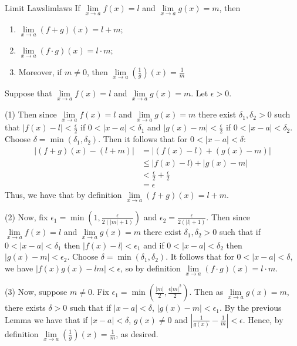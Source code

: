 \documentclass[12pt]{report}
\begin{document}
\begin{thm}{Limit Laws}{limlaws}
    If $\lim\limits_{x\rightarrow a}f(x) = l$ and $\lim\limits_{x\rightarrow a}g(x) = m$, then \begin{enumerate}
        \item $\lim\limits_{x\rightarrow a}(f+g)(x) = l+m$;
        \item $\lim\limits_{x\rightarrow a}(f\cdot g)(x) = l\cdot m$;
        \item Moreover, if $m \neq 0$, then $\lim\limits_{x\rightarrow a}\left(\frac{1}{g}\right)(x) = \frac{1}{m}$
    \end{enumerate}
\end{thm}
\begin{proof*}{}{}
    Suppose that $\lim\limits_{x\rightarrow a}f(x) = l$ and $\lim\limits_{x\rightarrow a}g(x) = m$. Let $\epsilon > 0$.


    (1) Then since $\lim\limits_{x\rightarrow a}f(x) = l$ and $\lim\limits_{x\rightarrow a}g(x) = m$ there exist $\delta_1,\delta_2 > 0$ such that $|f(x) - l| < \frac{\epsilon}{2}$ if $0 < |x-a| < \delta_1$ and $|g(x) - m| < \frac{\epsilon}{2}$ if $0 < |x-a| < \delta_2$. Choose $\delta = \min(\delta_1,\delta_2)$. Then it follows that for $0 < |x-a| < \delta$: \begin{align*}
        |(f+g)(x) - (l+m)| &= |(f(x) - l) + (g(x) - m)| \\
        &\leq |f(x) - l) + |g(x) - m| \\
        &< \frac{\epsilon}{2} + \frac{\epsilon}{2} \\
        &= \epsilon
    \end{align*}
    Thus, we have that by definition $\lim\limits_{x\rightarrow a}(f+g)(x) = l+m$.


    (2) Now, fix $\epsilon_1 = \min\left(1,\frac{\epsilon}{2(|m|+1)}\right)$ and $\epsilon_2 = \frac{\epsilon}{2(|l| + 1)}$. Then since $\lim\limits_{x\rightarrow a}f(x) = l$ and $\lim\limits_{x\rightarrow a}g(x) = m$ there exist $\delta_1, \delta_2> 0$ such that if $0<|x-a| < \delta_1$ then $|f(x) - l| < \epsilon_1$ and if $0<|x-a| < \delta_2$ then $|g(x) - m| < \epsilon_2$. Choose $\delta = \min(\delta_1,\delta_2)$. It follows that for $0<|x-a| < \delta$, we have $|f(x)g(x) - lm| < \epsilon$, so by definition $\lim\limits_{x\rightarrow a}(f\cdot g)(x) = l\cdot m$.



    (3) Now, suppose $m \neq 0$. Fix $\epsilon_1 = \min\left(\frac{|m|}{2},\frac{\epsilon|m|^2}{2}\right)$. Then as $\lim\limits_{x\rightarrow a}g(x) = m$, there exists $\delta > 0$ such that if $|x-a| < \delta$, $|g(x) - m| < \epsilon_1$. By the previous Lemma we have that if $|x-a| < \delta$, $g(x) \neq 0$ and $\left|\frac{1}{g(x)} - \frac{1}{m}\right| < \epsilon$. Hence, by definition $\lim\limits_{x\rightarrow a}\left(\frac{1}{g}\right)(x) = \frac{1}{m}$, as desired.
\end{proof*}
\end{document}
